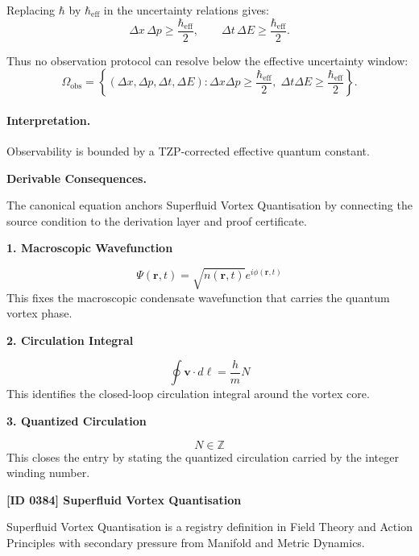 Replacing $\hbar$ by $\hbar_{\mathrm{eff}}$ in the uncertainty relations gives:
\begin{equation}
\Delta x\,\Delta p
\geq
\frac{\hbar_{\mathrm{eff}}}{2},
\qquad
\Delta t\,\Delta E
\geq
\frac{\hbar_{\mathrm{eff}}}{2}.
\end{equation}

Thus no observation protocol can resolve below the effective uncertainty window:
\begin{equation}
\boxed{
\Omega_{\mathrm{obs}}
=
\left\{
(\Delta x,\Delta p,\Delta t,\Delta E):
\Delta x\Delta p\geq \frac{\hbar_{\mathrm{eff}}}{2},
\;
\Delta t\Delta E\geq \frac{\hbar_{\mathrm{eff}}}{2}
\right\}.
}
\end{equation}

\paragraph{Interpretation.}
Observability is bounded by a TZP-corrected effective quantum constant.

\par\vspace{0.35em}
\noindent\textbf{Derivable Consequences.}\quad
\begingroup
\footnotesize
\raggedright
The canonical equation anchors Superfluid Vortex Quantisation by connecting the source condition to the derivation layer and proof certificate.
\par\endgroup

\noindent\textbf{1. Macroscopic Wavefunction}\par
\[
\Psi(\mathbf{r},t)=\sqrt{n(\mathbf{r},t)}e^{i\phi(\mathbf{r},t)}
\]
\noindent This fixes the macroscopic condensate wavefunction that carries the quantum vortex phase.\par
\noindent\textbf{2. Circulation Integral}\par
\[
\oint \mathbf{v}\cdot d\boldsymbol{\ell}=\frac{h}{m}N
\]
\noindent This identifies the closed-loop circulation integral around the vortex core.\par
\noindent\textbf{3. Quantized Circulation}\par
\[
N\in\mathbb{Z}
\]
\noindent This closes the entry by stating the quantized circulation carried by the integer winding number.\par

\clearpage
\noindent\textbf{[ID 0384] Superfluid Vortex Quantisation}\par
\vspace{0.35em}
\begingroup\small
{}
Superfluid Vortex Quantisation is a registry definition in Field Theory and Action Principles with secondary pressure from Manifold and Metric Dynamics.

